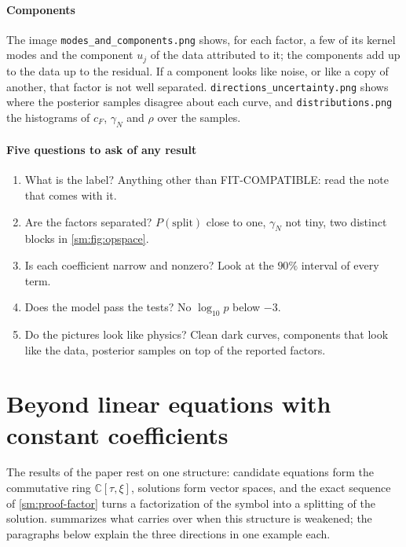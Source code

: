 \documentclass[11pt]{article}
\theoremstyle{plain}
\theoremstyle{definition}
\theoremstyle{remark}
\newcommand{\C}{\mathbb{C}}
\newcommand{\cF}{c_{F}}                     %
\newcommand{\gN}{\gamma_{N}}                %
\newcommand{\lab}[1]{\textsf{#1}}           %
\newcommand{\FC}{\lab{FIT-COMPATIBLE}}
\begin{document}
\paragraph{Components} The image \texttt{modes\_and\_components.png} shows, for each factor, a few of its kernel modes and
the component $u_j$ of the data attributed to it; the components add up to the data up to the residual. If a component
looks like noise, or like a copy of another, that factor is not well separated. \texttt{directions\_uncertainty.png}
shows where the posterior samples disagree about each curve, and \texttt{distributions.png} the histograms of $\cF$, $\gN$
and $\rho$ over the samples.

\paragraph{Five questions to ask of any result}
\begin{enumerate}
\item What is the label? Anything other than \FC: read the note that comes with it.
\item Are the factors separated? $P(\text{split})$ close to one, $\gN$ not tiny, two distinct blocks in
\cref{sm:fig:opspace}.
\item Is each coefficient narrow and nonzero? Look at the $90\%$ interval of every term.
\item Does the model pass the tests? No $\log_{10}p$ below $-3$.
\item Do the pictures look like physics? Clean dark curves, components that look like the data, posterior samples on top
of the reported factors.
\end{enumerate}



\section{Beyond linear equations with constant coefficients}\label{sm:beyond}
The results of the paper rest on one structure: candidate equations form the commutative ring $\C[\tau,\xi]$, solutions
form vector spaces, and the exact sequence of \cref{sm:proof-factor} turns a factorization of the symbol into a splitting
of the solution.  summarizes what carries over when this structure is weakened; the paragraphs below
explain the three directions in one example each.
\end{document}

